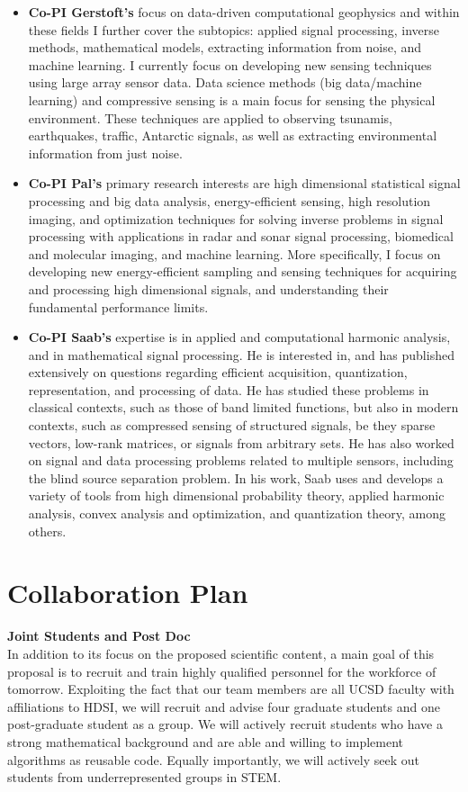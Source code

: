 \documentclass{article}
\begin{document}
\begin{itemize}
\item {\bf Co-PI Gerstoft's} focus on data-driven computational geophysics and within these fields I further cover the subtopics: applied signal processing, inverse methods, mathematical models, extracting information from noise, and machine learning. I currently focus on developing new sensing techniques using large array sensor data. Data science methods (big data/machine learning) and compressive sensing is a main focus for sensing the physical environment.  These techniques are applied to observing tsunamis, earthquakes, traffic, Antarctic signals, as well as extracting environmental information from just noise. 
\item {\bf Co-PI Pal's}  primary research interests are high dimensional statistical signal processing and big data analysis, energy-efficient sensing, high resolution imaging, and optimization techniques for solving inverse problems in signal processing with applications in radar and sonar signal processing, biomedical and molecular imaging, and machine learning. More specifically, I focus on developing new energy-efficient sampling and sensing techniques for acquiring and processing high dimensional signals, and understanding their fundamental performance limits. 
\item {\bf Co-PI Saab's} expertise is in applied and computational harmonic analysis, and in mathematical signal processing. He is interested in, and has published extensively on questions regarding efficient acquisition, quantization, representation, and processing of data. He has studied these problems in classical contexts, such as those of band limited functions, but also in modern contexts, such as compressed sensing of structured signals, be they sparse vectors, low-rank matrices, or signals from arbitrary sets. He has also worked on signal and data processing problems related to multiple sensors, including the blind source separation problem. In his work, Saab uses and develops a variety of tools from high dimensional probability theory, applied harmonic analysis, convex analysis and optimization, and quantization theory, among others. 
\end{itemize}
\vspace{1cm}

\section{Collaboration Plan}


{\bf Joint Students and Post Doc}\\
 In
addition to its focus on the proposed scientific content, a main goal
of this proposal is to recruit and train highly qualified personnel
for the workforce of tomorrow. Exploiting the fact that our team
members are all UCSD faculty with affiliations to HDSI, we will
recruit and advise four graduate students and one post-graduate student as a group. We
will actively recruit students who have a strong mathematical
background and are able and willing to implement algorithms as
reusable code. Equally importantly, we will actively seek out students
from underrepresented groups in STEM.
\end{document}
